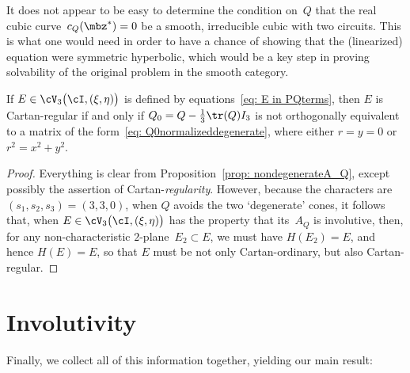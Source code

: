 \begin{Remark}\label{rem: Q-hyperbolicity}
It does not appear to be easy to determine the condition on~$Q$
that the real cubic curve~$c_Q(\mbz^*) = 0$ be a smooth,
irreducible cubic with two circuits. This is what one would need
in order to have a chance of showing that the (linearized) equation
were symmetric hyperbolic, which would be a key step in proving
solvability of the original problem in the smooth category.
\end{Remark}

\begin{Corollary}\label{cor: ECartan-ordinary}
If $E\in \cV_3\bigl(\cI,(\xi,\eta)\bigr)$
is defined by equations~\eqref{eq: E in PQterms},
then $E$ is Cartan-regular
if and only if $Q_0 = Q - \tfrac13\tr(Q)I_3$
is not orthogonally equivalent
to a matrix of the form~\eqref{eq: Q0normalizeddegenerate},
where either $r = y =0$ or $r^2 = x^2+y^2$.
\end{Corollary}

\begin{proof}
Everything is clear from Proposition~\ref{prop: nondegenerateA_Q},
except possibly the assertion of Cartan-\emph{regularity}.
However, because the characters are~$(s_1,s_2,s_3)=(3,3,0)$,
when $Q$ avoids the two `degenerate' cones, it follows that,
when $E\in\cV_3\bigl(\cI,(\xi,\eta)\bigr)$ has the property
that its~$A_Q$ is involutive, then, for any non-characteristic
$2$-plane~$E_2\subset E$, we must have $H(E_2) = E$, and hence
$H(E)=E$, so that $E$ must be not only Cartan-ordinary, but
also Cartan-regular.
\end{proof}

\section{Involutivity}\label{sec: Involutivity}
Finally, we collect all of this information together,
yielding our main result:

